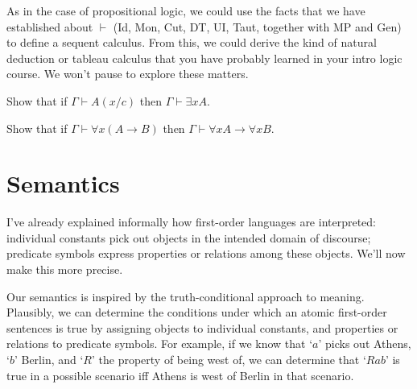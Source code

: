 As in the case of propositional logic,
we could use the facts that we have established about $\vdash$
(Id, Mon, Cut, DT, UI, Taut, together with MP and Gen)
to define a sequent calculus.
From this,
we could derive the kind of natural deduction or tableau calculus
that you have probably learned in your intro logic course.
We won't pause to explore these matters.

\begin{exercise}
  Show that if $\Gamma\vdash A(x/c)$ then $\Gamma \vdash \exists x A$.
\end{exercise}

\begin{exercise}
  Show that if $\Gamma \vdash \forall x (A \to B)$ then $\Gamma \vdash \forall x A \to \forall x B$.
\end{exercise}



\section{Semantics}\label{sec:semantics1}

I've already explained informally how first-order languages are interpreted:
individual constants pick out objects in the intended domain of discourse;
predicate symbols express properties or relations among these objects.
We'll now make this more precise.

Our semantics is inspired by the truth-conditional approach to meaning.
Plausibly,
we can determine the conditions under which an atomic first-order sentences is true
by assigning objects to individual constants,
and properties or relations to predicate symbols.
For example,
if we know that
`$a$' picks out Athens,
`$b$' Berlin,
and `$R$' the property of being west of,
we can determine that
`$Rab$' is true in a possible scenario iff Athens is west of Berlin in that scenario.

